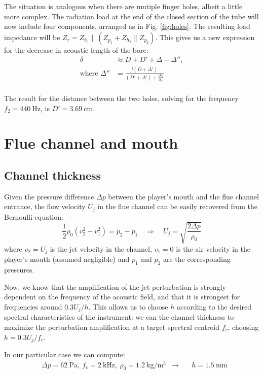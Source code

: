 \documentclass[a4paper]{article}
\begin{document}
The situation is analogous when there are mutiple finger holes, albeit a little more complex. The radiation load at the end of the closed section of the tube will now include four components, arranged as in Fig. \ref{fig:holes}. The resulting load impedance will be $Z_r = Z_{h_1}\parallel\left(Z_{p_1} + Z_{h_2}\parallel Z_{p_2} \right)$. This gives us a new expression for the decrease in acoustic length of the bore:
\begin{align*}
	\delta &\approx D + D' + \Delta - \Delta'', \\
	\text{where } \Delta'' &= \frac{l(D+\Delta') }{(D'+\Delta') + \frac{lS_2}{S_h}} \\
\end{align*} 

The result for the distance between the two holes, solving for the frequency $f_2 = 440~\si{\hertz}$, is $D'= 3.69~\si{\centi\meter}$.

\section{Flue channel and mouth}
\subsection{Channel thickness}

Given the pressure difference $\Delta p$ between the player's mouth and the flue channel entrance, the flow velocity $U_j$ in the flue channel can be easily recovered from the Bernoulli equation:
\[
	\frac{1}{2} \rho_0 \left( v_2^2 - v_1^2 \right) = p_2 - p_1 \quad \Rightarrow \quad
	U_j = \sqrt{\frac{2\Delta p}{\rho_0}}
\]
where $v_2 = U_j$ is the jet velocity in the channel, $v_1 = 0$ is the air velocity in the player's mouth (assumed negligible) and $p_1$ and $p_2$ are the corresponding pressures.

Now, we know that the amplification of the jet perturbation is strongly dependent on the frequency of the acoustic field, and that it is strongest for frequencies around $0.3U_j / h$. This allows us to choose $h$ according to the desired spectral characteristics of the instrument: we can  the channel thickness to maximize the perturbation amplification at a target spectral centroid $f_c$, choosing $ h = 0.3 U_j / f_c$.

In our particular case we can compute:
\begin{align*}
		&\Delta p = \SI{62}{\pascal},~ f_c = \SI{2}{\kilo\hertz},~ \rho_0 = \SI{1.2}{\kilogram\per\meter\cubed} &\longrightarrow \quad &\boxed{h = \SI{1.5}{\milli\metre}}\\
\end{align*}
\end{document}
